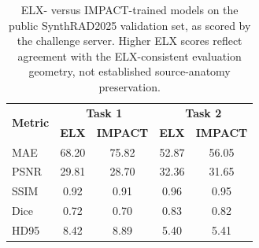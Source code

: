 \begin{table}[h!]
\centering
\footnotesize
\caption{ELX- versus IMPACT-trained models on the public SynthRAD2025 validation set, as scored by the challenge server. Higher ELX scores reflect agreement with the ELX-consistent evaluation geometry, not established source-anatomy preservation.}
\label{tab:public_split}
\begin{tabular}{lcc|cc}
\toprule
\multirow{2}{*}{\textbf{Metric}} & \multicolumn{2}{c|}{\textbf{Task 1}} & \multicolumn{2}{c}{\textbf{Task 2}} \\
 & \textbf{ELX} & \textbf{IMPACT} & \textbf{ELX} & \textbf{IMPACT} \\
\midrule
MAE  & 68.20 & 75.82 &       52.87 & 56.05 \\
PSNR & 29.81 & 28.70 &  32.36 & 31.65 \\
SSIM & 0.92 & 0.91 &        0.96 & 0.95 \\
Dice & 0.72 & 0.70 &        0.83 & 0.82 \\
HD95 & 8.42 & 8.89 &         5.40 & 5.41 \\
\bottomrule
\end{tabular}

\end{table}
